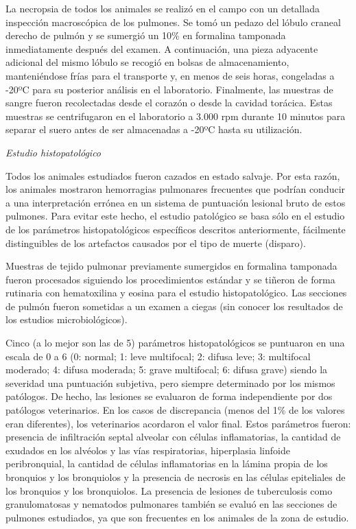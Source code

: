 \documentclass[12pt,a4paper,Spanish]{book}
\begin{document}
La necropsia de todos los animales se realizó en el campo con un detallada inspección macroscópica de los pulmones. Se tomó un pedazo del lóbulo craneal derecho de pulmón y se sumergió un 10\% en formalina tamponada inmediatamente después del examen. A continuación, una pieza adyacente adicional del mismo lóbulo se recogió en bolsas de almacenamiento, manteniéndose frías para el transporte y, en menos de seis horas, congeladas a -20ºC para su posterior análisis en el laboratorio. Finalmente, las muestras de sangre fueron recolectadas desde el corazón o desde la cavidad torácica. Estas muestras se centrifugaron en el laboratorio a 3.000 rpm durante 10 minutos para separar el suero antes de ser almacenadas a -20ºC hasta su utilización.

\textit{Estudio histopatológico}

Todos los animales estudiados fueron cazados en estado salvaje. Por esta razón, los animales mostraron hemorragias pulmonares frecuentes que podrían conducir a una interpretación errónea en un sistema de puntuación lesional bruto de estos pulmones. Para evitar este hecho, el estudio patológico se basa sólo en el estudio de los parámetros histopatológicos específicos descritos anteriormente, fácilmente distinguibles de los artefactos causados por el tipo de muerte (disparo).

Muestras de tejido pulmonar previamente sumergidos en formalina tamponada fueron procesados siguiendo los procedimientos estándar y se tiñeron de forma rutinaria con hematoxilina y eosina para el estudio histopatológico. Las secciones de pulmón fueron sometidas a un examen a ciegas (sin conocer los resultados de los estudios microbiológicos). 

Cinco (a lo mejor son las de 5) parámetros histopatológicos se puntuaron en una escala de 0 a 6 (0: normal; 1: leve multifocal; 2: difusa leve; 3: multifocal moderado; 4: difusa moderada; 5: grave multifocal; 6: difusa grave) siendo la severidad una puntuación subjetiva, pero siempre determinado por los mismos patólogos. De hecho, las lesiones se evaluaron de forma independiente por dos patólogos veterinarios. En los casos de discrepancia (menos del 1\% de los valores eran diferentes), los veterinarios acordaron el valor final. Estos parámetros fueron: presencia de infiltración septal alveolar con células inflamatorias, la cantidad de exudados en los alvéolos y las vías respiratorias, hiperplasia linfoide peribronquial, la cantidad de células inflamatorias en la lámina propia de los bronquios y los bronquiolos y la presencia de necrosis en las células epiteliales de los bronquios y los bronquiolos. La presencia de lesiones de tuberculosis como granulomatosas y nematodos pulmonares también se evaluó en las secciones de pulmones estudiados, ya que son frecuentes en los animales de la zona de estudio.
\end{document}

